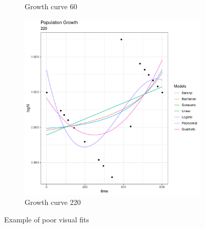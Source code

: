 \documentclass[titlepage]{article}
\begin{document}
\begin{figure}
\begin{subfigure}[t]{0.45\textwidth}
        \caption{Growth curve 60} \label{fig:timing2}
    \end{subfigure}

    \vspace{1cm}
    \begin{subfigure}[t]{0.8\textwidth}
    \centering
        \includegraphics[width=0.8\linewidth]{../results/plot_fits/plot_220.pdf} 
        \caption{Growth curve 220} \label{fig:timing3}
    \end{subfigure}
    \caption{Example of poor visual fits}
\end{figure}
\end{document}

